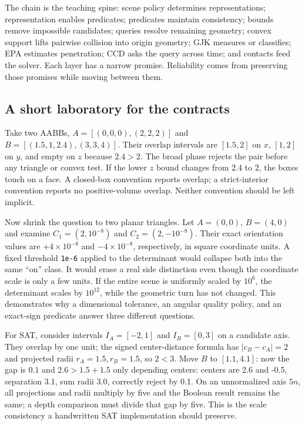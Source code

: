 The chain is the teaching spine: scene policy determines representations; representation enables predicates; predicates maintain consistency; bounds remove impossible candidates; queries resolve remaining geometry; convex support lifts pairwise collision into origin geometry; GJK measures or classifies; EPA estimates penetration; CCD asks the query across time; and contacts feed the solver. Each layer has a narrow promise. Reliability comes from preserving those promises while moving between them.

\subsection{A short laboratory for the contracts}\label{03-visual-computing-i-ch020-a-short-laboratory-for-the-contracts}

Take two AABBs, \(A=[(0,0,0),(2,2,2)]\) and \(B=[(1.5,1,2.4),(3,3,4)]\). Their overlap intervals are \([1.5,2]\) on \(x\), \([1,2]\) on \(y\), and empty on \(z\) because \(2.4>2\). The broad phase rejects the pair before any triangle or convex test. If the lower \(z\) bound changes from \(2.4\) to \(2\), the boxes touch on a face. A closed-box convention reports overlap; a strict-interior convention reports no positive-volume overlap. Neither convention should be left implicit.

Now shrink the question to two planar triangles. Let \(A=(0,0)\), \(B=(4,0)\) and examine \(C_1=(2,10^{-8})\) and \(C_2=(2,-10^{-8})\). Their exact orientation values are \(+4\times10^{-8}\) and \(-4\times10^{-8}\), respectively, in square coordinate units. A fixed threshold \texttt{1e-6} applied to the determinant would collapse both into the same ``on'' class. It would erase a real side distinction even though the coordinate scale is only a few units. If the entire scene is uniformly scaled by \(10^6\), the determinant scales by \(10^{12}\), while the geometric turn has not changed. This demonstrates why a dimensional tolerance, an angular quality policy, and an exact-sign predicate answer three different questions.

For SAT, consider intervals \(I_A=[-2,1]\) and \(I_B=[0,3]\) on a candidate axis. They overlap by one unit; the signed center-distance formula has \(|c_B-c_A|=2\) and projected radii \(r_A=1.5,r_B=1.5\), so \(2<3\). Move \(B\) to \([1.1,4.1]\): now the gap is \(0.1\) and \(2.6>1.5+1.5\) only depending centers: centers are 2.6 and -0.5, separation 3.1, sum radii 3.0, correctly reject by 0.1. On an unnormalized axis \(5n\), all projections and radii multiply by five and the Boolean result remains the same; a depth comparison must divide that gap by five. This is the scale consistency a handwritten SAT implementation should preserve.


